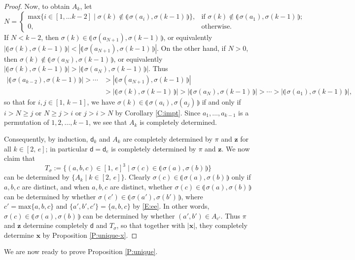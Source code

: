 \documentclass[11pt,a4paper,reqno]{amsart}
\numberwithin{equation}{section}
\theoremstyle{plain}
\theoremstyle{definition}
\theoremstyle{remark}
\numberwithin{equation}{section}
\newcommand{\bx}{\mathbf{x}}
\newcommand{\bz}{\mathbf{z}}
\renewcommand{\max}{\mathrm{max}}
\newcommand{\dd}{\mathsf{d}}
\newcommand{\ft}[2]{\llparenthesis\, #1,#2 \,\rrparenthesis}
\begin{document}
\begin{proof}
Now,
to obtain $A_k$, 
let 
$$
N = 
\begin{cases}
\max\{ i \in [1,\dotsc k-2] \mid \sigma(k) \notin \ft{\sigma(a_i)}{\sigma(k-1)} \}, 
&\text{if } \sigma(k) \notin \ft{\sigma(a_1)}{\sigma(k-1)}; \\
0, &\text{otherwise.} 
\end{cases}
$$
If $N < k-2$, then $\sigma(k) \in \ft{\sigma(a_{N+1})}{\sigma(k-1)}$, or equivalently $|\ft{\sigma(k)}{\sigma(k-1)}| < |\ft{\sigma(a_{N+1})}{\sigma(k-1)}|$.  On the other hand, if $N >0$, then  $\sigma(k) \notin \ft{\sigma(a_N)}{\sigma(k-1)}$, or equivalently $|\ft{\sigma(k)}{\sigma(k-1)}| > |\ft{\sigma(a_{N})}{\sigma(k-1)}|$.
Thus 
\begin{align*}
|\ft{\sigma(a_{k-2})}{\sigma(k-1)}| > \dotsb &> |\ft{\sigma(a_{N+1})}{\sigma(k-1)}| \\
&>  |\ft{\sigma(k)}{\sigma(k-1)}| > |\ft{\sigma(a_{N})}{\sigma(k-1)}| > \dotsb > |\ft{\sigma(a_1)}{\sigma(k-1)}|,
\end{align*}
so that for $i, j \in [1,\, k-1]$, we have
$\sigma(k) \in \ft{\sigma(a_i)}{\sigma(a_j)}$ if and only if $i > N \geq j$ or $N \geq j> i$ or $j > i > N$ by Corollary \ref{C:impt}.
Since $a_1,\dotsc, a_{k-1}$ is a permutation of $1,2,\dotsc, k-1$, we see that $A_k$ is completely determined.

Consequently, by induction, $\dd_k$ and $A_k$ are completely determined by $\pi$ and $\bz$ for all $k \in [2,\,e]$; in particular $\dd = \dd_e$ is completely determined by $\pi$ and $\bz$.
We now claim that
$$T_{\sigma} := \{ (a,b,c) \in [1,\,e]^3 \mid \sigma(c) \in \ft{\sigma(a)}{\sigma(b)} \}$$ can be determined by $\{ A_k \mid k \in [2,\,e]\}$.
Clearly $\sigma(c) \in \ft{\sigma(a)}{\sigma(b)}$ only if $a,b,c$ are distinct,
and when $a,b,c$ are distinct, whether $\sigma(c) \in \ft{\sigma(a)}{\sigma(b)}$ can be determined by whether $\sigma(c') \in \ft{\sigma(a')}{\sigma(b')}$, where $c' =\max\{a,b,c\}$ and $\{a', b', c'\} = \{a,b,c\}$ by \eqref{E:ee}.
In other words, $\sigma(c) \in \ft{\sigma(a)}{\sigma(b)}$ can be determined by whether $(a',b') \in A_{c'}$.
Thus $\pi$ and $\bz$ determine completely $\dd$ and $T_{\sigma}$, so that together with $|\bx|$, they completely determine $\bx$ by Proposition \ref{P:unique-x}.
\end{proof}


We are now ready to prove Proposition \ref{P:unique}.
\end{document}
